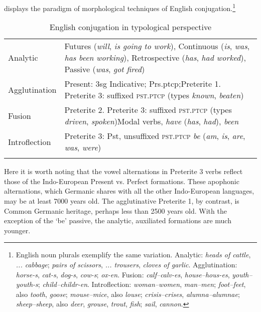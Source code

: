 \documentclass[output=paper, colorlinks,citecolor=brown]{langsci/langscibook}
\begin{document}
 displays the paradigm of morphological techniques of English conjugation.{\footnote{English noun plurals exemplify the same variation. Analytic: \textit{heads of cattle}, \textit{... cabbage}; \textit{pairs of scissors}, \textit{... trousers}, \textit{cloves of garlic}. Agglutination: \textit{horse-s}, \textit{cat-s}, \textit{dog-s}, \textit{cow-s}; \textit{ox-en}. Fusion: \textit{calf–calv-es}, \textit{house–hous-es}, \textit{youth–youth-s}; \textit{child–childr-en}. Introflection: \textit{woman–women}, \textit{man–men}; \textit{foot–feet}, also \textit{tooth}, \textit{goose}; \textit{mouse–mice}, also \textit{louse}; \textit{crisis–crises}, \textit{alumna–alumnae}; \textit{sheep–sheep}, also \textit{deer}, \textit{grouse}, \textit{trout}, \textit{fish}; \textit{sail}, \textit{cannon}.}}
 

\begin{table}
\caption{English conjugation in typological perspective}
\label{tab:andersen_12}
\begin{tabularx}{\textwidth}{lQ}
\lsptoprule
Analytic & Futures (\textit{will}, \textit{is going to work}), Continuous (\textit{is}, \textit{was}, \textit{has been} \textit{working}), Retrospective (\textit{has}, \textit{had worked}), Passive (\textit{was}, \textit{got fired})\\
Agglutination & Present: 3sg Indicative; Prs.ptcp;\newline Preterite 1. Preterite 3: suffixed \textsc{pst.ptcp} (types \textit{known}, \textit{beaten})\\
Fusion & Preterite 2. Preterite 3: suffixed \textsc{pst.ptcp} (types \textit{driven}, \textit{spoken})\newline Modal verbs, \textit{have} (\textit{has}, \textit{had}), \textit{been}\\
Introflection & Preterite 3: Pst, unsuffixed \textsc{pst.ptcp} 
\textit{be} (\textit{am}, \textit{is}, \textit{are}, \textit{was}, \textit{were})\\
\lspbottomrule
\end{tabularx}
\end{table}



Here it is worth noting that the vowel alternations in Preterite 3 verbs reflect those of the Indo-European Present vs. Perfect formations. These apophonic alternations, which Germanic shares with all the other Indo-European languages, may be at least 7000 years old. The agglutinative Preterite 1, by contrast, is Common Germanic heritage, perhaps less than 2500 years old. With the exception of the ‘be' passive, the analytic, auxiliated formations are much younger. 
\end{document}
